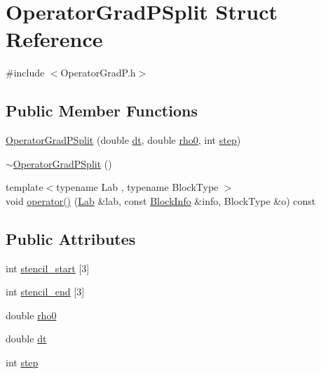 \hypertarget{struct_operator_grad_p_split}{}\section{Operator\+Grad\+P\+Split Struct Reference}
\label{struct_operator_grad_p_split}


{\ttfamily \#include $<$Operator\+Grad\+P.\+h$>$}

\subsection*{Public Member Functions}
\begin{DoxyCompactItemize}
\item 
\hyperlink{struct_operator_grad_p_split_a8da51bf59061b4f94510f6023be4670b}{Operator\+Grad\+P\+Split} (double \hyperlink{struct_operator_grad_p_split_a76dc525edafb4f7929b3f31b1b63fcd0}{dt}, double \hyperlink{struct_operator_grad_p_split_a1755962320ba6bde611712d25f728a86}{rho0}, int \hyperlink{struct_operator_grad_p_split_a3c2c3f52bff9a44096d838acd2ad396b}{step})
\item 
\hyperlink{struct_operator_grad_p_split_a746617dce0ec1f07252ae018bfe57adf}{$\sim$\+Operator\+Grad\+P\+Split} ()
\item 
{\footnotesize template$<$typename Lab , typename Block\+Type $>$ }\\void \hyperlink{struct_operator_grad_p_split_ad93e7297f5476603c6f86f0c6fcfefac}{operator()} (\hyperlink{_definitions_8h_ad6f951af9a2a6ebc1975404882b34314}{Lab} \&lab, const \hyperlink{struct_block_info}{Block\+Info} \&info, Block\+Type \&o) const 
\end{DoxyCompactItemize}
\subsection*{Public Attributes}
\begin{DoxyCompactItemize}
\item 
int \hyperlink{struct_operator_grad_p_split_a53e3860439ef1e9344117f7e31f51ecc}{stencil\+\_\+start} \mbox{[}3\mbox{]}
\item 
int \hyperlink{struct_operator_grad_p_split_ad96817ee3db1828eea1c24d8cc22e4e9}{stencil\+\_\+end} \mbox{[}3\mbox{]}
\item 
double \hyperlink{struct_operator_grad_p_split_a1755962320ba6bde611712d25f728a86}{rho0}
\item 
double \hyperlink{struct_operator_grad_p_split_a76dc525edafb4f7929b3f31b1b63fcd0}{dt}
\item 
int \hyperlink{struct_operator_grad_p_split_a3c2c3f52bff9a44096d838acd2ad396b}{step}
\end{DoxyCompactItemize}


